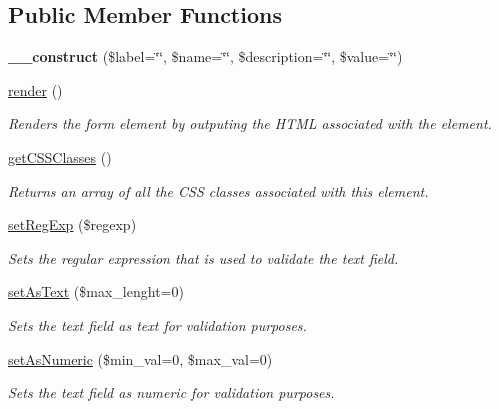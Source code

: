 \subsection*{Public Member Functions}
\begin{DoxyCompactItemize}
\item 
\hypertarget{class_text_field_a0f3c1bbf6321580bd09a121aa40eb3d6}{
{\bfseries \_\-\_\-construct} (\$label=\char`\"{}\char`\"{}, \$name=\char`\"{}\char`\"{}, \$description=\char`\"{}\char`\"{}, \$value=\char`\"{}\char`\"{})}
\label{class_text_field_a0f3c1bbf6321580bd09a121aa40eb3d6}

\item 
\hyperlink{class_text_field_a519c28ac5dcb35ecde4f5a7a441ef7c5}{render} ()
\begin{DoxyCompactList}\small\item\em Renders the form element by outputing the HTML associated with the element. \item\end{DoxyCompactList}\item 
\hyperlink{class_text_field_a3e19e7ea11d59c52a8039f94b44db656}{getCSSClasses} ()
\begin{DoxyCompactList}\small\item\em Returns an array of all the CSS classes associated with this element. \item\end{DoxyCompactList}\item 
\hyperlink{class_text_field_aefdb80683fc9bf82acd01114f3732210}{setRegExp} (\$regexp)
\begin{DoxyCompactList}\small\item\em Sets the regular expression that is used to validate the text field. \item\end{DoxyCompactList}\item 
\hyperlink{class_text_field_ac2ad9c3bcd29ebb3738d5cf1e4fadd8e}{setAsText} (\$max\_\-lenght=0)
\begin{DoxyCompactList}\small\item\em Sets the text field as text for validation purposes. \item\end{DoxyCompactList}\item 
\hyperlink{class_text_field_a42f24fe465c8f5c9199d2dc91fce23ef}{setAsNumeric} (\$min\_\-val=0, \$max\_\-val=0)
\begin{DoxyCompactList}\small\item\em Sets the text field as numeric for validation purposes. \item\end{DoxyCompactList}\end{DoxyCompactItemize}
